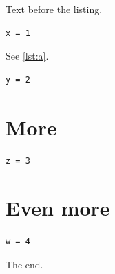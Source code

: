 \documentclass{article}
\begin{document}
Text before the listing.
\begin{lstlisting}[caption={A short caption},label=lst:a]
x = 1
\end{lstlisting}
See \cref{lst:a}.
\begin{lstlisting}[caption={A caption long enough that it no longer fits on one line, so that it hangs from the label after it}]
y = 2
\end{lstlisting}
\section{More}
\begin{lstlisting}
z = 3
\end{lstlisting}
\section{Even more}
\begin{lstlisting}[caption={Below a heading}]
w = 4
\end{lstlisting}
The end.
\end{document}
